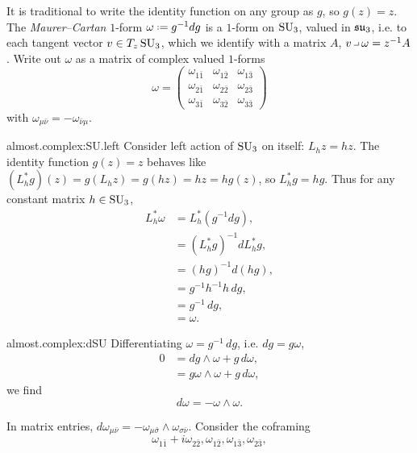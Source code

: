 \begin{example}
It is traditional to write the identity function on any group as \(g\), so \(g(z)=z\).
The \emph{Maurer--Cartan} \(1\)-form \(\omega\defeq g^{-1}dg\) is a \(1\)-form on \(\operatorname{SU}_{3}\), valued in \(\LieSU_3\), i.e. to each tangent vector \(v\in T_z \operatorname{SU}_{3}\), which we identify with a matrix \(A\), \(v\hook\omega=z^{-1}A\).
Write out \(\omega\) as a matrix of complex valued \(1\)-forms
\[
\omega
=
\begin{pmatrix}
\omega_{1\bar{1}}&\omega_{1\bar{2}}&\omega_{1\bar{3}}\\
\omega_{2\bar{1}}&\omega_{2\bar{2}}&\omega_{2\bar{3}}\\
\omega_{3\bar{1}}&\omega_{3\bar{2}}&\omega_{3\bar{3}}
\end{pmatrix}
\]
with \(\omega_{\mu\bar\nu}=-\omega_{\bar\nu\mu}\).
\begin{answer}{almost.complex:SU.left}
Consider left action of \(\operatorname{SU}_{3}\) on itself: \(L_h z=hz\).
The identity function \(g(z)=z\) behaves like \((L_h^*g)(z)=g(L_hz)=g(hz)=hz=hg(z)\), so \(L_h^*g=hg\).
Thus for any constant matrix \(h\in\operatorname{SU}_{3}\),
\begin{align*}
L_h^*\omega
&=L_h^*(g^{-1}dg),
\\
&=(L_h^*g)^{-1}dL_h^*g,
\\
&=
(hg)^{-1}d(hg),
\\
&=
g^{-1}h^{-1}h \, dg,
\\
&=
g^{-1}\,dg,
\\
&=\omega.
\end{align*}
\end{answer}
\begin{answer}{almost.complex:dSU}
Differentiating \(\omega=g^{-1}\,dg\), i.e. \(dg=g\omega\),
\begin{align*}
0&=
dg\wedge\omega+g\,d\omega,
\\
&=
g\omega\wedge\omega+g\,d\omega,
\end{align*}
we find 
\[
d\omega=-\omega\wedge\omega.
\]
\end{answer}
In matrix entries,
\(d\omega_{\mu\bar\nu}=-\omega_{\mu\bar\sigma}\wedge\omega_{\sigma\bar\nu}\).
Consider the coframing 
\[
\omega_{1\bar{1}}+i\omega_{2\bar{2}},\omega_{1\bar{2}},\omega_{1\bar{3}},\omega_{2\bar{3}},
\]
\end{example}
